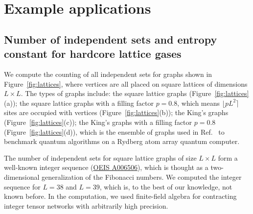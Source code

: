 \documentclass[onefignum, onetabnum]{siamart190516}
\newcommand{\<}{\langle}
\renewcommand{\>}{\rangle}
\newcounter{example}
\begin{document}
\section{Example applications} \label{sec:examples}

\subsection{Number of independent sets and entropy constant for hardcore lattice gases}\label{sec:entropy}
We compute the counting of all independent sets for graphs shown in Figure~\ref{fig:lattices}, where vertices are all placed on square lattices of dimensions $L \times L$.
The types of graphs include: the square lattice graphs (Figure~\ref{fig:lattices}(a)); the square lattice graphs with a filling factor $p=0.8$, which means $\lfloor pL^{2} \rceil$ sites are occupied with vertices  (Figure~\ref{fig:lattices}(b));
the King's graphs  (Figure~\ref{fig:lattices}(c)); the King's graphs with a filling factor $p = 0.8$  (Figure~\ref{fig:lattices}(d)), which is the ensemble of graphs used in Ref.~\cite{Ebadi2022} to benchmark quantum algorithms on a Rydberg atom array quantum computer. 

The number of independent sets for square lattice graphs of size $L \times L$ form a well-known integer sequence (\href{https://oeis.org/A006506}{OEIS A006506}), which is thought as a two-dimensional generalization of the Fibonacci numbers.
We computed the integer sequence for $L=38$ and $L=39$, which is, to the best of our knowledge, not known before.
In the computation, we used finite-field algebra for contracting integer tensor networks with arbitrarily high precision. 
\end{document}

